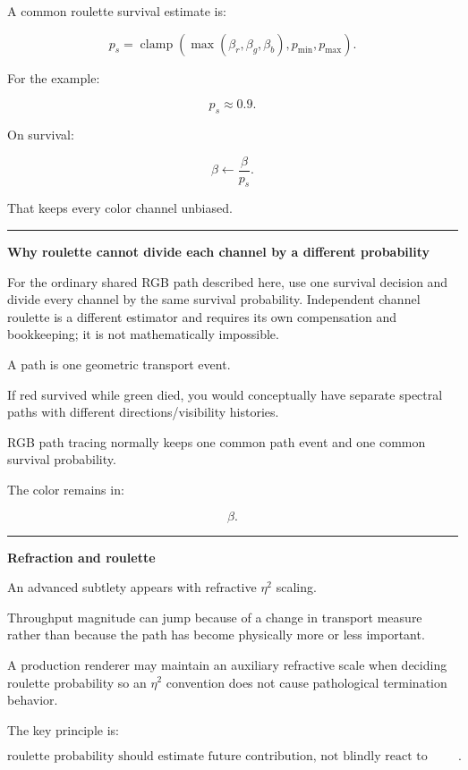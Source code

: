 A common roulette survival estimate is:

\[
\boxed{
p_s=
\operatorname{clamp}
(
\max(\beta_r,\beta_g,\beta_b),
p_{\min},
p_{\max}
).
}
\]

For the example:

\[
p_s\approx0.9.
\]

On survival:

\[
\boxed{
\beta\leftarrow\frac{\beta}{p_s}.
}
\]

That keeps every color channel unbiased.

\begin{center}\rule{0.5\linewidth}{0.5pt}\end{center}

\textbf{Why roulette cannot divide each channel by a different probability}

For the ordinary shared RGB path described here, use one survival decision and divide every channel by the same survival probability. Independent channel roulette is a different estimator and requires its own compensation and bookkeeping; it is not mathematically impossible.

A path is one geometric transport event.

If red survived while green died, you would conceptually have separate spectral paths with different directions/visibility histories.

RGB path tracing normally keeps one common path event and one common survival probability.

The color remains in:

\[
\beta.
\]

\begin{center}\rule{0.5\linewidth}{0.5pt}\end{center}

\textbf{Refraction and roulette}

An advanced subtlety appears with refractive \(\eta^2\) scaling.

Throughput magnitude can jump because of a change in transport measure rather than because the path has become physically more or less important.

A production renderer may maintain an auxiliary refractive scale when deciding roulette probability so an \(\eta^2\) convention does not cause pathological termination behavior.

The key principle is:

\[
\boxed{
\text{roulette probability should estimate future contribution, not blindly react to representation artifacts}.
}
\]

